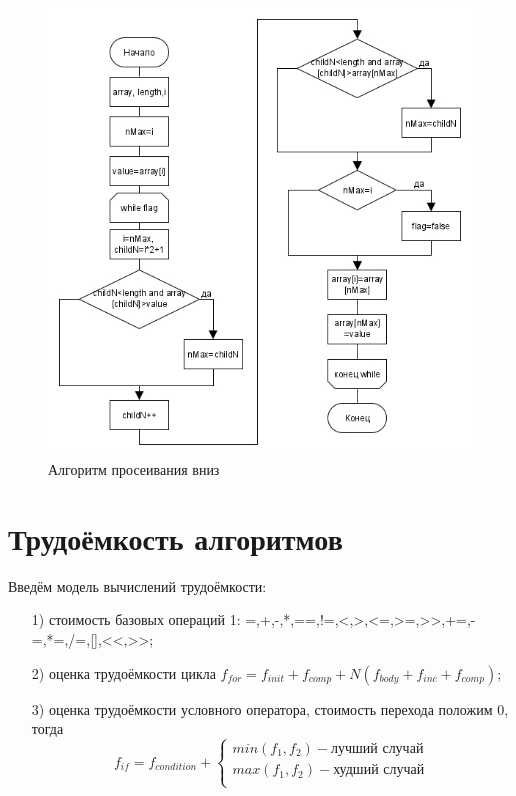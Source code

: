 \begin{figure}
	\centering
	\includegraphics[height=0.7\textheight]{src/siftDown}
	\caption{Алгоритм просеивания вниз}
	\label{fig:siftdown}
\end{figure}

\section{Трудоёмкость алгоритмов}
\label{sec:labour}
Введём модель вычислений трудоёмкости:
\begin{enumerate}
	\item[1)] стоимость базовых операций 1: =,+,-,*,==,!=,<,>,<=,>=,>>,+=,-=,*=,/=,[],<<,>>;
	\item[2)] оценка трудоёмкости цикла $f_{for}=f_{init}+f_{comp}+N(f_{body}+f_{inc}+f_{comp})$;
	\item[3)] оценка трудоёмкости условного оператора, стоимость перехода положим 0, тогда
	\begin{equation}
f_{if}=f_{condition}+\begin{cases}
min(f_{1},f_{2})-\text{лучший случай}\\
max(f_{1},f_{2})-\text{худший случай}\\
\end{cases}
	\end{equation} 
\end{enumerate}
